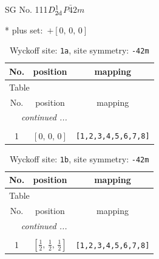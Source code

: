 \documentclass[fleqn,8pt]{jsarticle}
\begin{document}
\setcounter{MaxMatrixCols}{32}

\renewcommand{\tablename}{Table~}
\renewcommand{\figurename}{Figure~}
\begin{center}
\LARGE
SG No. 111\quad$D_{\rm 2d}^{1}$\quad$P\bar{4}2m$\quad[ tetragonal ]
\end{center}
* plus set:\,\,\,$+\left[ 0,\, 0,\, 0 \right]$
\renewcommand{\arraystretch}{1.2}
\begin{longtable}{ccc}
\caption{Wyckoff site: {\tt 1a}, site symmetry: {\tt -42m}}
 \\
 \hline \hline
No. & position & mapping \\ \hline \endfirsthead

\multicolumn{2}{l}{\tablename\ \thetable{}} \\
 \hline \hline
No. & position & mapping \\ \hline \endhead

 \hline \hline
\multicolumn{2}{r}{\footnotesize\it continued ...} \\ \endfoot

 \hline \hline
\multicolumn{2}{r}{} \\ \endlastfoot

1 & $\left[ 0,\, 0,\, 0 \right]$ & {\tt [1,2,3,4,5,6,7,8]} \\
\end{longtable}
\renewcommand{\arraystretch}{1.2}
\begin{longtable}{ccc}
\caption{Wyckoff site: {\tt 1b}, site symmetry: {\tt -42m}}
 \\
 \hline \hline
No. & position & mapping \\ \hline \endfirsthead

\multicolumn{2}{l}{\tablename\ \thetable{}} \\
 \hline \hline
No. & position & mapping \\ \hline \endhead

 \hline \hline
\multicolumn{2}{r}{\footnotesize\it continued ...} \\ \endfoot

 \hline \hline
\multicolumn{2}{r}{} \\ \endlastfoot

1 & $\left[ \frac{1}{2},\, \frac{1}{2},\, \frac{1}{2} \right]$ & {\tt [1,2,3,4,5,6,7,8]} \\
\end{longtable}
\renewcommand{\arraystretch}{1.2}
\end{document}
